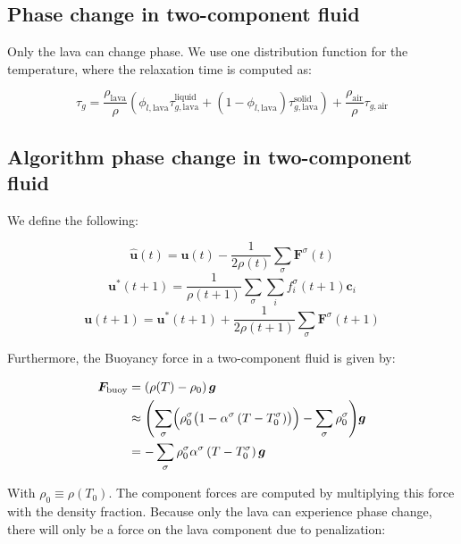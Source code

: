 \subsection{Phase change in two-component fluid}
Only the lava can change phase. We use one distribution function for the temperature, where the relaxation time is computed as:

\begin{equation}
    \tau_g = \frac{\rho_{\text{lava}}}{\rho} \left(\phi_{l,\text{lava}}\tau_{g,\text{lava}}^{\text{liquid}} + \left(1-\phi_{l,\text{lava}}\right)\tau_{g,\text{lava}}^{\text{solid}}\right) + \frac{\rho_{\text{air}}}{\rho}\tau_{g,\text{air}}
\end{equation}

\subsection{Algorithm phase change in two-component fluid}

We define the following:

\begin{equation}
    \hat{\bm{u}}(t) = \bm{u}(t) - \frac{1}{2 \rho(t)} \sum_\sigma \bm{F}^\sigma(t)
\end{equation}
\begin{equation}
    \bm{u}^*(t+1) = \frac{1}{\rho(t+1)}\sum_\sigma \sum_i f_i^\sigma(t+1) \bm{c}_i
\end{equation}
\begin{equation}
    \bm{u}(t+1) = \bm{u}^*(t+1) + \frac{1}{2 \rho(t+1)} \sum_\sigma \bm{F}^\sigma(t+1)
\end{equation}

Furthermore, the Buoyancy force in a two-component fluid is given by:

\begin{equation}
\begin{split}
    \bm{F}_{\text{buoy}} &= \left(\rho(T) - \rho_0\right) \bm{g}\\
    &\approx \Biggl(\sum_\sigma \Bigl( \rho_0^\sigma \bigl( 1 - \alpha^\sigma \left(T - T_0^\sigma\right) \bigr)\Bigr)  - \sum_\sigma \rho_0^\sigma\Biggr) \bm{g}\\
    &= -\sum_\sigma \rho_0^\sigma \alpha^\sigma \left(T - T_0^\sigma\right)\bm{g}
\end{split}
\end{equation}

With $\rho_0 \equiv \rho(T_0)$. The component forces are computed by multiplying this force with the density fraction. Because only the lava can experience phase change, there will only be a force on the lava component due to penalization:

